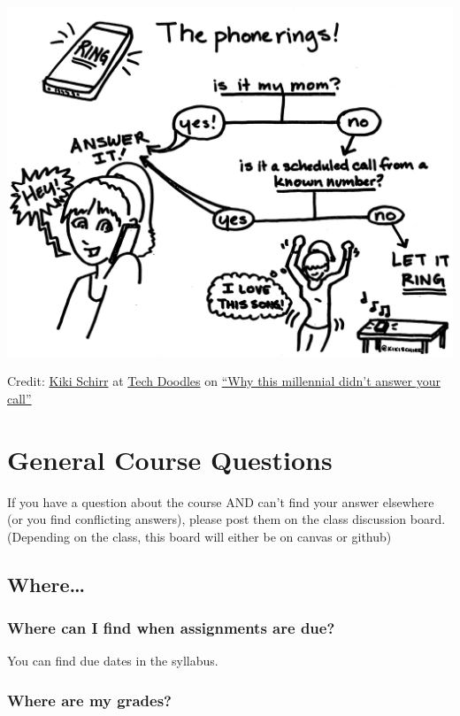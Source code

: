\documentclass[
]{book}
\begin{document}
\begin{center}\includegraphics[width=0.5\linewidth]{img/why-this-millennial-didnt-answer-your-call} \end{center}

Credit: \href{https://kikischirr.medium.com/}{Kiki Schirr} at \href{https://medium.com/tech-doodles}{Tech Doodles} on \href{https://medium.com/tech-doodles/why-this-millennial-didnt-answer-your-call-d5abccf06cfc}{``Why this millennial didn't answer your call''}

\hypertarget{general-course-questions}{%
\section{General Course Questions}\label{general-course-questions}}

If you have a question about the course AND can't find your answer elsewhere (or you find conflicting answers), please post them on the class discussion board. (Depending on the class, this board will either be on canvas or github)

\hypertarget{where}{%
\subsection{Where\ldots{}}\label{where}}

\hypertarget{where-can-i-find-when-assignments-are-due}{%
\subsubsection{Where can I find when assignments are due?}\label{where-can-i-find-when-assignments-are-due}}

You can find due dates in the syllabus.

\hypertarget{where-are-my-grades}{%
\subsubsection{Where are my grades?}\label{where-are-my-grades}}
\end{document}
